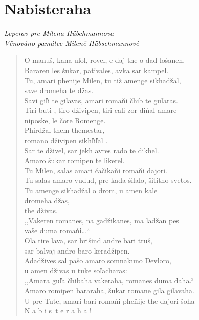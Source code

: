 \bigskip

\section{Nabisteraha}

\noindent
\textit{Leperav pre Milena Hübchmannova \\ Věnováno památce Mileně Hübschmannové}

\begin{verse}
O manuš, kana uľol, rovel, e daj the o dad lošanen. \\
Bararen les šukar, pativales, avka sar kampel. \\
Tu, amari phenije Milen, tu tiž amenge sikhadžal, \\
save dromeha te džas. \\
Savi giľi te giľavas, amari romaňi čhib te guľaras. \\
Tiri buti , tiro dživipen, tiri cali zor diňal amare \\
niposke, le čore Romenge. \\
Phirdžal  them themestar,  \\
romano dživipen sikhľiľal . \\
Sar te dživel, sar jekh avres  rado te dikhel. \\
Amaro šukar romipen  te ľikerel. \\
Tu Milen, salas amari čačikaňi romaňi dajori. \\
Tu salas amaro vudud, pre kada šilalo, šititno svetos. \\
Tu amenge sikhadžal o  drom, u amen kale  \\
 \hspace{\fill}dromeha džas, \\
the dživas. \\
,,Vakeren  romanes, na gadžikanes, ma ladžan pes \\
 \hspace{\fill}vaše duma romaňi\ldots`` \\
Ola tire lava, sar brišind andre bari truš, \\
 \hspace{\fill}sar balvaj andro baro keradžipen. \\
 Adadžives sal  pašo amaro somnakuno Devloro, \\
 \hspace{\fill}u amen dživas u tuke  soľacharas: \\
,,Amara guľa čhibaha vakeraha, romanes duma daha.`` \\
Amaro romipen bararaha, šukar romane giľa  giľavaha. \\
U pre Tute, amari bari romaňi pheňije the dajori šoha \\ 
N a b i s t e r a h a  !
\end{verse}

